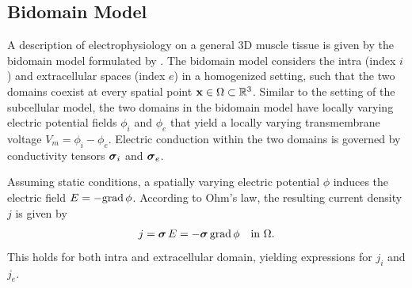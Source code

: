
\subsection{Bidomain Model}\label{sec:bidomain_model}

A description of electrophysiology on a general 3D muscle tissue is given by the bidomain model formulated by \cite{tung1978bi,peskoff1979electric}. The bidomain model considers the intra (index $i$) and extracellular spaces (index $e$) in a homogenized setting, such that the two domains coexist at every spatial point $\textbf{x} \in \Omega\subset \mathbb{R}^3$. Similar to the setting of the subcellular model, the two domains in the bidomain model have locally varying electric potential fields $\phi_i$ and $\phi_e$ that yield a locally varying transmembrane voltage $V_m=\phi_i - \phi_e$. Electric conduction within the two domains is governed by conductivity tensors $\boldsymbol{\sigma}_i$ and $\boldsymbol{\sigma}_e$. 

Assuming static conditions, a spatially varying electric potential $\phi$ induces the electric field $E=-\hbox{grad} \, \phi$.
According to Ohm's law, the resulting current density $j$ is given by 
%
\begin{align}\label{eq:bidomain_helper1}
  j = \boldsymbol{\sigma}\,E = -\boldsymbol{\sigma}\,\hbox{grad} \, \phi \quad \text{in }\Omega.
\end{align}
This holds for both intra and extracellular domain, yielding expressions for $j_i$ and $j_e$.

